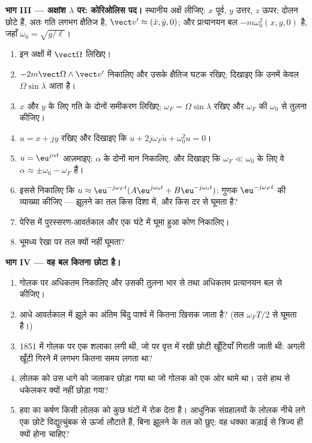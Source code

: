 \begin{problem}
\medskip
\noindent\textbf{भाग III --- अक्षांश $\lambda$ पर: कोरिओलिस पद।}
स्थानीय अक्षें लीजिए: $x$ पूर्व, $y$ उत्तर, $z$ ऊपर; दोलन छोटे हैं, अतः
गति लगभग क्षैतिज है, $\vect v' \approx (\dot x, \dot y, 0)$; और प्रत्यानयन
बल $-m\omega_0^2(x, y, 0)$ है, जहाँ $\omega_0 = \sqrt{g/\ell}$।
\begin{enumerate}[resume]
  \item इन अक्षों में $\vect\Omega$ लिखिए।
  \item $-2m\vect\Omega\wedge\vect v'$ निकालिए और उसके क्षैतिज घटक रखिए;
        दिखाइए कि उनमें केवल $\Omega\sin\lambda$ आता है।
  \item $x$ और $y$ के लिए गति के दोनों समीकरण लिखिए;
        $\omega_F = \Omega\sin\lambda$ रखिए और $\omega_F$ की $\omega_0$ से
        तुलना कीजिए।
  \item $u = x + jy$ रखिए और दिखाइए कि $\ddot u + 2j\omega_F\dot u +
        \omega_0^2u = 0$।
  \item $u = \eu^{j\alpha t}$ आज़माइए: $\alpha$ के दोनों मान निकालिए, और
        दिखाइए कि $\omega_F \ll \omega_0$ के लिए वे $\alpha \approx \pm\omega_0
        - \omega_F$ हैं।
  \item इससे निकालिए कि $u \approx \eu^{-j\omega_Ft}(A\eu^{j\omega_0t} + B\eu^{-j\omega_0t})$:
        गुणक $\eu^{-j\omega_Ft}$ की व्याख्या कीजिए --- झूलने का तल किस
        दिशा में, और किस दर से घूमता है?
  \item पेरिस में पुरस्सरण-आवर्तकाल और एक घंटे में घूमा हुआ कोण निकालिए।
  \item भूमध्य रेखा पर तल क्यों नहीं घूमता?
\end{enumerate}

\medskip
\noindent\textbf{भाग IV --- वह बल कितना छोटा है।}
\begin{enumerate}[resume]
  \item गोलक पर अधिकतम  निकालिए और उसकी तुलना भार से तथा
        अधिकतम प्रत्यानयन बल से कीजिए।
  \item आधे आवर्तकाल में झूले का अंतिम बिंदु पार्श्व में कितना खिसक जाता
        है? (तल $\omega_FT/2$ से घूमता है।)
  \item 1851 में गोलक पर एक शलाका लगी थी, जो  पर वृत्त में रखी छोटी
        खूँटियाँ गिराती जाती थी: अगली खूँटी गिरने में लगभग कितना समय
        लगता था?
  \item लोलक को उस धागे को जलाकर छोड़ा गया था जो गोलक को एक ओर थामे था।
        उसे हाथ से धकेलकर क्यों नहीं छोड़ा गया?
  \item हवा का कर्षण किसी लोलक को कुछ घंटों में रोक देता है। आधुनिक
        संग्रहालयों के लोलक नीचे लगे एक छोटे विद्युत्चुंबक से ऊर्जा
        लौटाते हैं, बिना झूलने के तल को छुए: वह धक्का कड़ाई से त्रिज्य ही
        क्यों होना चाहिए?
\end{enumerate}


\end{problem}
